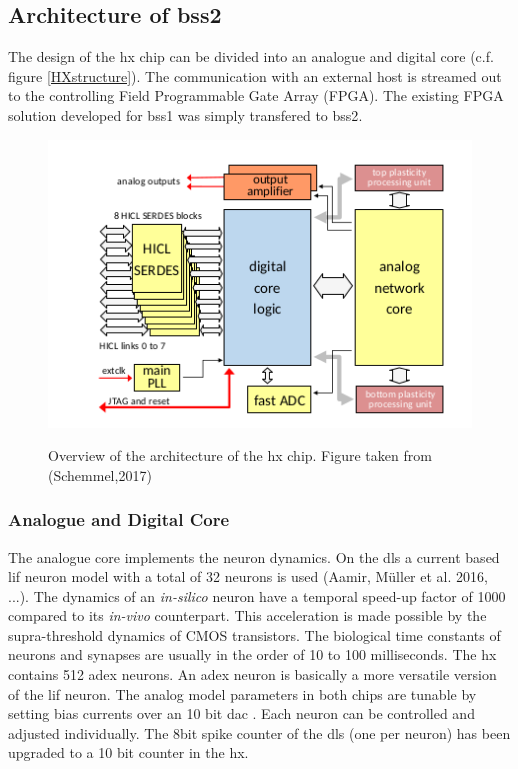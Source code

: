 \subsection{Architecture of \gls{bss2}}

The design of the \gls{hx} chip can be divided into an analogue and digital core (c.f. figure \ref{HXstructure}). The communication with an external host is streamed out to the controlling Field Programmable Gate Array (FPGA). The existing FPGA solution developed for \gls{bss1} was simply transfered to \gls{bss2}.

\begin{figure}
	\includegraphics{figures/HXstructure.png}
	\label{hxstructure}
	\caption{Overview of the architecture of the \gls{hx} chip. Figure taken from (Schemmel,2017)}
\end{figure}

\subsubsection*{Analogue and Digital Core}
The analogue core implements the neuron dynamics. On the \gls{dls} a current based \gls{lif} neuron model with a total of 32 neurons is used (Aamir, Müller et al. 2016, ...). The dynamics of an \textit{in-silico} neuron have a temporal speed-up factor of 1000 compared to its \textit{in-vivo} counterpart. This acceleration is made possible by the supra-threshold dynamics of CMOS transistors. The biological time constants of neurons and synapses are usually in the order of 10 to 100 milliseconds. The \gls{hx} contains 512 \gls{adex} neurons. An \gls{adex} neuron is basically a more versatile version of the \gls{lif} neuron. The analog model parameters in both chips are tunable by setting bias currents over an 10 bit \gls{dac} \cite{hock13analogmemory}. Each neuron can be controlled and adjusted individually. The 8bit spike counter of the \gls{dls} (one per neuron) has been upgraded to a 10 bit counter in the \gls{hx}. 


